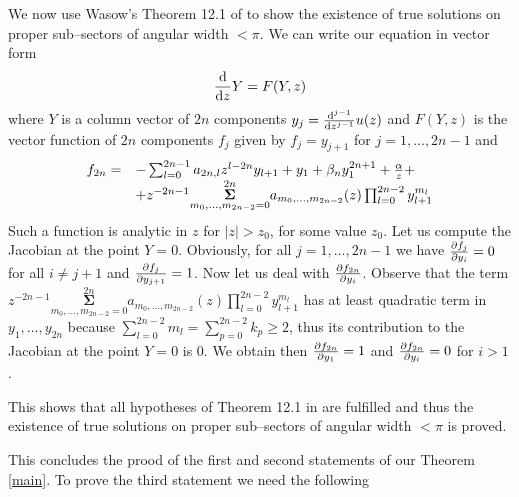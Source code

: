\documentclass{amsart}
\theoremstyle{definition}
\theoremstyle{remark}
\theoremstyle{remark}
\begin{document}
We now use Wasow's Theorem 12.1 of \cite{Was} to show the existence of
true solutions on proper sub--sectors of angular width $<\pi$. We can
write our equation in vector form
$$
{{\rm d}\over{\rm d} z} Y = F(Y,z)
$$
where $Y$ is a column vector of $2n$ components
$y_j={{\rm d}^{j-1}\over{\rm d} z^{j-1}} u(z)$ and $F(Y,z)$ is the
vector function of $2n$ components $f_j$ given by $f_j=y_{j+1}$ for
$j=1,\dots,2n-1$ and
$$
\begin{array}{ll}
f_{2n}=&-\sum_{l=0}^{2n-1} a_{2n,l}z^{l-2n} y_{l+1}+ y_1 +
\beta_n y_1^{2n+1}+{\alpha\over z}+\\
&+z^{-2n-1}
\overset{2n}{\underset{m_0,\dots,m_{2n-2}=0}
{{\boldsymbol{\Sigma}}}}
a_{m_0,\dots,m_{2n-2}}(z)\prod_{l=0}^{2n-2}
y_{l+1}^{m_l}\\
\end{array}
$$
Such a function is analytic in $z$ for $|z|>z_0$, for some value
$z_0$. Let us compute the Jacobian at the point $Y=0$. Obviously, for
all $j=1,\dots,2n-1$ we have ${\partial f_j\over\partial y_i}=0$ for
all $i\neq j+1$ and ${\partial f_j\over\partial y_{j+1}}=1$.
Now let us deal with
${\partial f_{2n}\over\partial y_i}$. Observe that the term
$z^{-2n-1}\overset{2n}{\underset{m_0,\dots,m_{2n-2}=0}
{{\boldsymbol{\Sigma}}}}
a_{m_0,\dots,m_{2n-2}}(z)\prod_{l=0}^{2n-2}y_{l+1}^{m_l}$
has at least quadratic term in $y_1,\dots,y_{2n}$ because
$\sum_{l=0}^{2n-2}m_l=\sum_{p=0}^{2n-2} k_p\geq 2$, thus its
contribution to the  Jacobian at the point $Y=0$ is $0$. We obtain
then ${\partial f_{2n}\over\partial y_1}=1$ and
${\partial f_{2n}\over\partial y_i}=0$ for $i>1$.

This shows that all hypotheses of Theorem 12.1 in \cite{Was} are fulfilled and
thus the existence of true solutions on proper sub--sectors
of angular width $<\pi$ is proved.

This concludes the prood of the first and
second statements of our Theorem \ref{main}. To prove the third statement
we need the following
\end{document}
